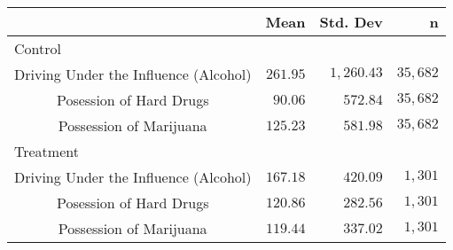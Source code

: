 \begin{longtable}{crrr}
\toprule
 & Mean & Std. Dev & n \\ 
\midrule
\multicolumn{4}{l}{Control} \\ 
\midrule
Driving Under the Influence (Alcohol) & $261.95$ & $1,260.43$ & $35,682$ \\ 
Posession of Hard Drugs & $90.06$ & $572.84$ & $35,682$ \\ 
Possession of Marijuana & $125.23$ & $581.98$ & $35,682$ \\ 
\midrule
\multicolumn{4}{l}{Treatment} \\ 
\midrule
Driving Under the Influence (Alcohol) & $167.18$ & $420.09$ & $1,301$ \\ 
Posession of Hard Drugs & $120.86$ & $282.56$ & $1,301$ \\ 
Possession of Marijuana & $119.44$ & $337.02$ & $1,301$ \\ 
\bottomrule
\end{longtable}

